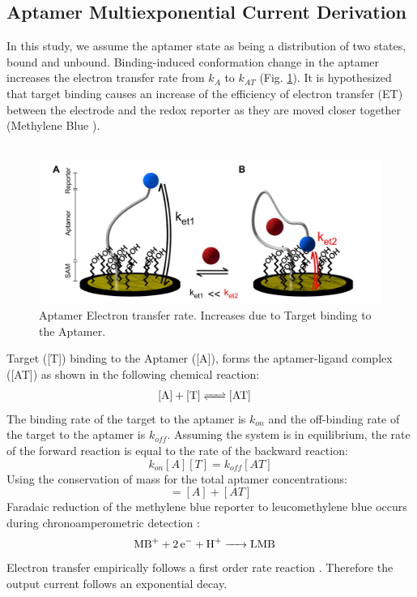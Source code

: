 \begin{appendices}
\section{Aptamer Multiexponential Current Derivation}
\label{Aptamer_multiexp}
In this study, we assume the aptamer state as being a distribution of two states, bound and unbound. Binding-induced conformation change in the aptamer increases the electron transfer rate from $k_{A}$ to $k_{AT}$ (Fig. \ref{aptamerrate}). It is hypothesized that target binding causes an
increase of the efficiency of electron transfer (ET) between the
electrode and the redox reporter as they are moved closer together \cite{farjami2011off} (Methylene Blue \cite{arroyo2018subsecond}).\\\\
\begin{figure}[H]
    \centering
    \includegraphics[width = 1.0\textwidth]{img/aptamerdiagram2.png}
    \caption{Aptamer Electron transfer rate. Increases due to Target binding to the Aptamer.\cite{arroyo2018subsecond}}
    \label{aptamerrate}
\end{figure}
Target ([T]) binding to the Aptamer ([A]), forms the aptamer-ligand complex ([AT]) as shown in the following chemical reaction:
\begin{align}
\cee{[A] + [T]  &<=> [AT]} 
\end{align}
The binding rate of the target to the aptamer is $k_{on}$ and the off-binding rate of the target to the aptamer is $k_{off}$. Assuming the system is in equilibrium, the rate of the forward reaction is equal to the rate of the backward reaction:
\begin{equation}
k_{on}[A][T] = k_{off}[AT]
\end{equation}
Using the conservation of mass for the total aptamer concentrations:
\begin{equation}
[A_{0}] = [A] + [AT]
\end{equation}
Faradaic reduction of the methylene blue reporter to leucomethylene blue occurs during chronoamperometric detection
 \cite{zhan1990mechanisms}:
\begin{align}
\cee{MB^{+} + 2e^{-} + H^{+}  &-> LMB} 
\end{align}
Electron transfer empirically follows a first order rate reaction \cite{bard1983electrochemical, forster1994electrochemistry}. Therefore the output current follows an exponential decay.


\end{appendices}
